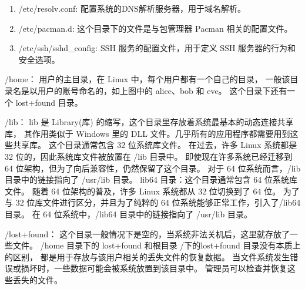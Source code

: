 \documentclass{ctexart}
\begin{document}
    \begin{enumerate}[labelindent=\parindent, leftmargin=*, align=left]
        \item /etc/resolv.conf: 配置系统的DNS解析服务器，用于域名解析。
        \item /etc/pacman.d: 这个目录下的文件是与包管理器 Pacman 相关的配置文件。
        \item /etc/ssh/sshd\_config: SSH 服务的配置文件，用于定义 SSH 服务器的行为和安全选项。
    \end{enumerate}

    /home：
    用户的主目录，在 Linux 中，每个用户都有一个自己的目录，
    一般该目录名是以用户的账号命名的，如上图中的 alice、bob 和 eve。
    这个目录下还有一个 lost+found 目录。

    /lib：
    lib 是 Library(库) 的缩写，这个目录里存放着系统最基本的动态连接共享库，
    其作用类似于 Windows 里的 DLL 文件。几乎所有的应用程序都需要用到这些共享库。
    这个目录通常包含 32 位系统库文件。
    在过去，许多 Linux 系统都是 32 位的，因此系统库文件被放置在 /lib 目录中。
    即使现在许多系统已经迁移到 64 位架构，但为了向后兼容性，仍然保留了这个目录。
    对于 64 位系统而言，/lib 目录中的链接指向了 /usr/lib 目录。
    lib64 目录：这个目录通常包含 64 位系统库文件。
    随着 64 位架构的普及，许多 Linux 系统都从 32 位切换到了 64 位。
    为了与 32 位库文件进行区分，并且为了纯粹的 64 位系统能够正常工作，引入了/lib64 目录。
    在 64 位系统中，/lib64 目录中的链接指向了 /usr/lib 目录。

    /lost+found：
    这个目录一般情况下是空的，当系统非法关机后，这里就存放了一些文件。
    /home 目录下的 lost+found 和根目录 /下的lost+found 目录没有本质上的区别，
    都是用于存放与该用户相关的丢失文件的恢复数据。
    当文件系统发生错误或损坏时，一些数据可能会被系统放置到该目录中。
    管理员可以检查并恢复这些丢失的文件。
\end{document}
